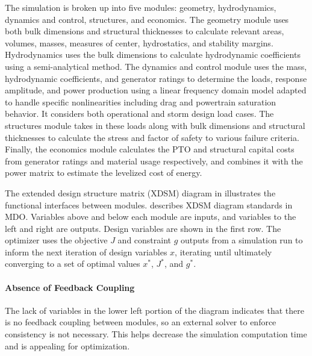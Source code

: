 The simulation is broken up into five modules: geometry, hydrodynamics, dynamics and control, structures, and economics.
The geometry module uses both bulk dimensions and structural thicknesses to calculate relevant areas, volumes, masses, measures of center, hydrostatics, and stability margins.
Hydrodynamics uses the bulk dimensions to calculate hydrodynamic coefficients using a semi-analytical method.
The dynamics and control module uses the mass, hydrodynamic coefficients, and generator ratings to determine the loads, response amplitude, and power production using a linear frequency domain model adapted to handle specific nonlinearities including drag and powertrain saturation behavior.
It considers both operational and storm design load cases.
The structures module takes in these loads along with bulk dimensions and structural thicknesses to calculate the stress and factor of safety to various failure criteria.
Finally, the economics module calculates the PTO and structural capital costs from generator ratings and material usage respectively, and combines it with the power matrix to estimate the levelized cost of energy.

The extended design structure matrix (XDSM) diagram in  illustrates the functional interfaces between modules.
\citet{lambe_extensions_2012} describes XDSM diagram standards in MDO.
Variables above and below each module are inputs, and variables to the left and right are outputs.
Design variables are shown in the first row.
The optimizer uses the objective $J$ and constraint $g$ outputs from a simulation run to inform the next iteration of design variables $x$, iterating until ultimately converging to a set of optimal values $x^*$, $J^*$, and $g^*$.

\paragraph{Absence of Feedback Coupling}
The lack of variables in the lower left portion of the diagram indicates that there is no feedback coupling between modules, so an external solver to enforce consistency is not necessary.
This helps decrease the simulation computation time and is appealing for optimization.

